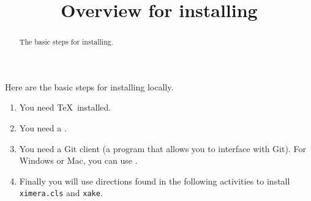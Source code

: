 \documentclass{ximera}
\title{Overview for installing}
\begin{document}
\begin{abstract}
  The basic steps for installing.
\end{abstract}
\maketitle

Here are the basic steps for installing locally.

\begin{enumerate}
\item You need \TeX\ installed.
\item You need a .
\item You need a Git client (a program that allows you to interface
  with Git). For Windows or Mac, you can use .
\item Finally you will use directions found in the following activities to install \verb|ximera.cls| and \verb|xake|.
\end{enumerate}
\end{document}
